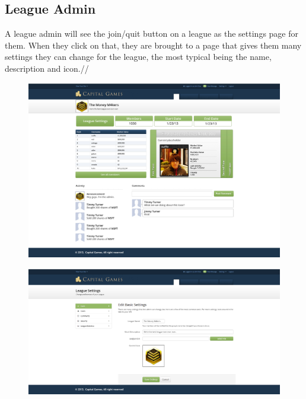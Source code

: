\subsection{League Admin}
A league admin will see the join/quit button on a league as the settings page for them. When they click on that, they are brought to a page that gives them many settings they can change for the league, the most typical being the name, description and icon.//
\begin{figure}
\centering
\includegraphics[width=5.5in]{./mockups/JPEG/Leagues_admin.jpg}
\end{figure}
\begin{figure}
\centering
\includegraphics[width=5.5in]{./mockups/JPEG/league_admin.jpg}
\end{figure}


